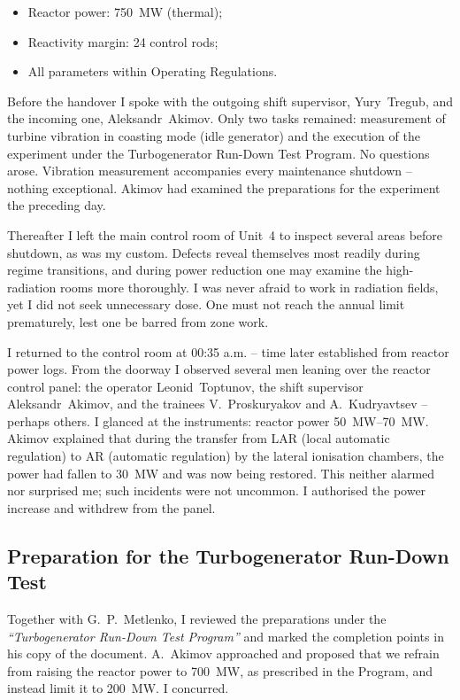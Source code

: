 \documentclass[openright]{bookest}
\begin{document}
\begin{itemize}
\item Reactor power: \qty{750}{\mega\watt} (thermal);
\item Reactivity margin: \num{24} control rods;
\item All parameters within Operating Regulations.
\end{itemize}

Before the handover I spoke with the outgoing shift supervisor, Yury~Tregub, and the incoming one, Aleksandr~Akimov. Only two tasks remained: measurement of turbine vibration in coasting mode (idle generator) and the execution of the experiment under the Turbogenerator Run-Down Test Program. No questions arose. Vibration measurement accompanies every maintenance shutdown -- nothing exceptional. Akimov had examined the preparations for the experiment the preceding day.

Thereafter I left the main control room of Unit~4 to inspect several areas before shutdown, as was my custom. Defects reveal themselves most readily during regime transitions, and during power reduction one may examine the high-radiation rooms more thoroughly. I was never afraid to work in radiation fields, yet I did not seek unnecessary dose. One must not reach the annual limit prematurely, lest one be barred from zone work.

I returned to the control room at 00:35 a.m. -- time later established from reactor power logs. From the doorway I observed several men leaning over the reactor control panel: the operator Leonid~Toptunov, the shift supervisor Aleksandr~Akimov, and the trainees V.~Proskuryakov and A.~Kudryavtsev -- perhaps others. I glanced at the instruments: reactor power \qtyrange[range-open-phrase={\text{between} },range-phrase={ \text{and} }]{50}{70}{\mega\watt}. Akimov explained that during the transfer from LAR (local automatic regulation) to AR (automatic regulation) by the lateral ionisation chambers, the power had fallen to \qty{30}{\mega\watt} and was now being restored. This neither alarmed nor surprised me; such incidents were not uncommon. I authorised the power increase and withdrew from the panel.

\subsection{Preparation for the Turbogenerator Run-Down Test}

Together with G.~P.~Metlenko, I reviewed the preparations under the \textit{``Turbogenerator Run-Down Test Program''} and marked the completion points in his copy of the document. A.~Akimov approached and proposed that we refrain from raising the reactor power to \qty{700}{\mega\watt}, as prescribed in the Program, and instead limit it to \qty{200}{\mega\watt}. I concurred.
\end{document}
